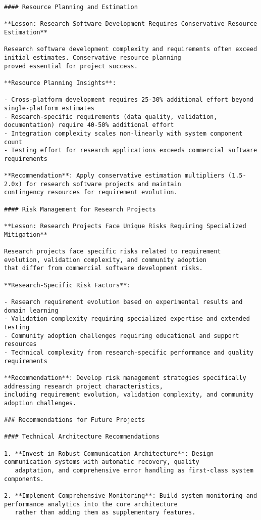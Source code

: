 \documentclass[12pt,a4paper]{report}
\begin{document}
\begin{verbatim}
#### Resource Planning and Estimation

**Lesson: Research Software Development Requires Conservative Resource Estimation**

Research software development complexity and requirements often exceed initial estimates. Conservative resource planning
proved essential for project success.

**Resource Planning Insights**:

- Cross-platform development requires 25-30% additional effort beyond single-platform estimates
- Research-specific requirements (data quality, validation, documentation) require 40-50% additional effort
- Integration complexity scales non-linearly with system component count
- Testing effort for research applications exceeds commercial software requirements

**Recommendation**: Apply conservative estimation multipliers (1.5-2.0x) for research software projects and maintain
contingency resources for requirement evolution.

#### Risk Management for Research Projects

**Lesson: Research Projects Face Unique Risks Requiring Specialized Mitigation**

Research projects face specific risks related to requirement evolution, validation complexity, and community adoption
that differ from commercial software development risks.

**Research-Specific Risk Factors**:

- Research requirement evolution based on experimental results and domain learning
- Validation complexity requiring specialized expertise and extended testing
- Community adoption challenges requiring educational and support resources
- Technical complexity from research-specific performance and quality requirements

**Recommendation**: Develop risk management strategies specifically addressing research project characteristics,
including requirement evolution, validation complexity, and community adoption challenges.

### Recommendations for Future Projects

#### Technical Architecture Recommendations

1. **Invest in Robust Communication Architecture**: Design communication systems with automatic recovery, quality
   adaptation, and comprehensive error handling as first-class system components.

2. **Implement Comprehensive Monitoring**: Build system monitoring and performance analytics into the core architecture
   rather than adding them as supplementary features.


\end{verbatim}
\end{document}
